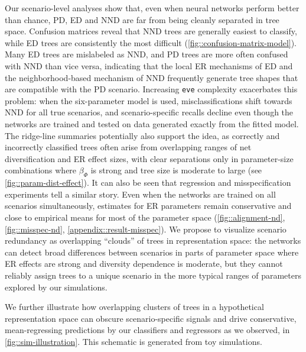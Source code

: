 {Our scenario-level analyses show that, even when neural networks perform better than chance, PD, ED and NND are far from being cleanly separated in tree space. Confusion matrices reveal that NND trees are generally easiest to classify, while ED trees are consistently the most difficult (\autoref{fig::confusion-matrix-model}). Many ED trees are mislabeled as NND, and PD trees are more often confused with NND than vice versa, indicating that the local ER mechanisms of ED and the neighborhood-based mechanism of NND frequently generate tree shapes that are compatible with the PD scenario. Increasing \texttt{eve} complexity exacerbates this problem: when the six-parameter model is used, misclassifications shift towards NND for all true scenarios, and scenario-specific recalls decline even though the networks are trained and tested on data generated exactly from the fitted model. The ridge-line summaries potentially also support the idea, as correctly and incorrectly classified trees often arise from overlapping ranges of net diversification and ER effect sizes, with clear separations only in parameter-size combinations where $\beta_{\varPhi}$ is strong and tree size is moderate to large (see \autoref{fig::param-dist-effect}). It can also be seen that regression and misspecification experiments tell a similar story. Even when the networks are trained on all scenarios simultaneously, estimates for ER parameters remain conservative and close to empirical means for most of the parameter space (\autoref{fig::alignment-nd}, \autoref{fig::misspec-nd}, \autoref{appendix::result-misspec}). We propose to visualize scenario redundancy as overlapping “clouds” of trees in representation space: the networks can detect broad differences between scenarios in parts of parameter space where ER effects are strong and diversity dependence is moderate, but they cannot reliably assign trees to a unique scenario in the more typical ranges of parameters explored by our simulations.

We further illustrate how overlapping clusters of trees in a hypothetical representation space can obscure scenario-specific signals and drive conservative, mean-regressing predictions by our classifiers and regressors as we observed, in \autoref{fig::sim-illustration}. This schematic is generated from toy simulations.

}
